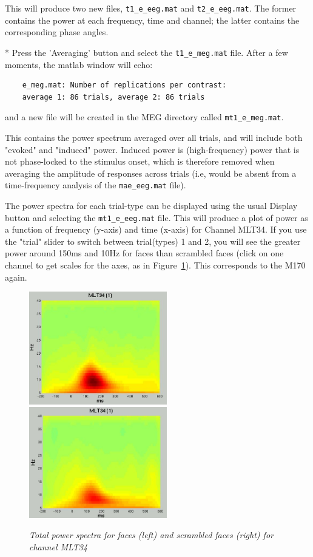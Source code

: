This will produce two new files, \verb!t1_e_eeg.mat! and  \verb!t2_e_eeg.mat!. The former contains the power at each frequency, time and channel; the latter contains the corresponding phase angles.

* Press the 'Averaging' button and select the \verb!t1_e_meg.mat! file. After a few moments, the matlab window will echo:
\begin{verbatim}
	e_meg.mat: Number of replications per contrast:
	average 1: 86 trials, average 2: 86 trials
\end{verbatim}
	and a new file will be created in the MEG directory called \verb!mt1_e_meg.mat!.

This contains the power spectrum averaged over all trials, and will include both "evoked" and "induced" power. Induced power is (high-frequency) power that is not phase-locked to the stimulus onset, which is therefore removed when averaging the amplitude of responses across trials (i.e, would be absent from a time-frequency analysis of the \verb!mae_eeg.mat! file).

The power spectra for each trial-type can be displayed using the usual Display button and selecting the \verb!mt1_e_eeg.mat! file. This will produce a plot of power as a function of frequency (y-axis) and time (x-axis) for Channel MLT34. If you use the "trial" slider to switch between trial(types) 1 and 2, you will see the greater power around 150ms and 10Hz for faces than scrambled faces (click on one channel to get scales for the axes, as in Figure~\ref{fig_32_13}). This corresponds to the M170 again.

\begin{figure}
\begin{center}
\includegraphics[width=60mm]{multimodal/figures/figure_32_13_L}
\includegraphics[width=60mm]{multimodal/figures/figure_32_13_R}
\caption{\em  Total power spectra for faces (left) and scrambled faces (right) for channel MLT34\label{fig_32_13}}
\end{center}
\end{figure}


